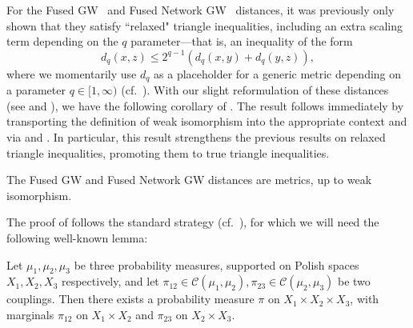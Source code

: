 \documentclass[twoside,11pt]{article}
\theoremstyle{definition}
\begin{document}
For the Fused GW~\citep{vayer2020fused} and Fused Network GW~\citep{yang2023exploiting} distances, it was previously only shown that they satisfy ``relaxed" triangle inequalities, including an extra scaling term depending on the $q$ parameter---that is, an inequality of the form
\[
d_q(x,z) \leq 2^{q-1}(d_q(x,y) + d_q(y,z)),
\]
where we momentarily use $d_q$ as a placeholder for a generic metric depending on a parameter $q \in [1,\infty)$ (cf.~\citealp[Theorem 1]{vayer2020fused}).
With our slight reformulation of these distances (see  and ), we have the following corollary of . The result follows immediately by transporting the definition of weak isomorphism into the appropriate context and via  and . In particular, this result strengthens the previous results on relaxed triangle inequalities, promoting them to true triangle inequalities.
\begin{corollary}\label{cor:fusedGW_triangle}
    The Fused GW and Fused Network GW distances are metrics, up to weak isomorphism.
\end{corollary}
The proof of  follows the standard strategy (cf.~\citealt{memoli2011}), for which we will need the following well-known lemma:
\begin{lemma}
    Let $\mu_1,\mu_2,\mu_3$ be three probability measures, supported on Polish spaces $X_1,X_2,X_3$ respectively, and let $\pi_{12}\in \mathcal{C}(\mu_1,\mu_2), \pi_{23}\in \mathcal{C}(\mu_2,\mu_3)$ be two couplings. Then there exists a probability measure $\pi$ on $X_1\times X_2\times X_3$, with marginals $\pi_{12}$ on $X_1\times X_2$ and $\pi_{23}$ on $X_2\times X_3$.
\end{lemma}
\end{document}
